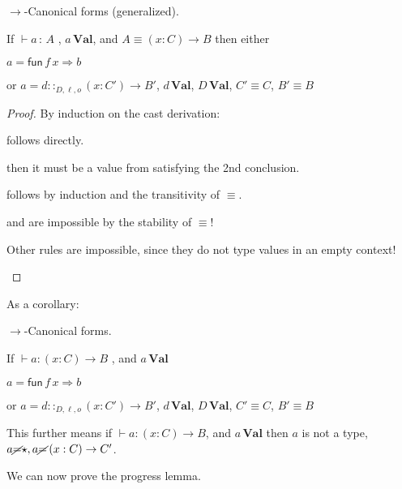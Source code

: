 \begin{lem} $\rightarrow$-Canonical forms (generalized).
 
If $\vdash a\,:\,A$ , $a\,\textbf{Val}$, and $A\equiv\left(x:C\right)\rightarrow B$ then either
 
$a=\mathsf{fun}\,f\,x\Rightarrow b$
 
or $a=d::_{D,\ell ,o}\left(x:C'\right)\rightarrow B'$, $d\,\textbf{Val}$, $D\,\textbf{Val}$, $C'\equiv C$, $B'\equiv B$
\end{lem}
\begin{proof}
By induction on the cast derivation:
\begin{casenv}
 \item {} follows directly.
 \item {} then it must be a value from  satisfying the 2nd conclusion.
 \item {} follows by induction and the transitivity of $\equiv$.
 
 \item {} and  are impossible by the stability of $\equiv$!
 \item Other rules are impossible, since they do not type values in an empty context!
\end{casenv}
\end{proof}

As a corollary:

\begin{cor} $\rightarrow$-Canonical forms.
 
If $\vdash a:\left(x:C\right)\rightarrow B$ , and $a\,\textbf{Val}$
 
$a=\mathsf{fun}\,f\,x\Rightarrow b$
 
or $a=d::_{D,\ell ,o}\left(x:C'\right)\rightarrow B'$, $d\,\textbf{Val}$, $D\,\textbf{Val}$, $C'\equiv C$, $B'\equiv B$
\end{cor}
 
This further means if $\vdash a:\left(x:C\right)\rightarrow B$, and $a\,\textbf{Val}$ then $a$ is not a type, $a\cancel{=}\star,a\cancel{=}\left(x:C\right)\rightarrow C'$.
 
We can now prove the progress lemma.
 
